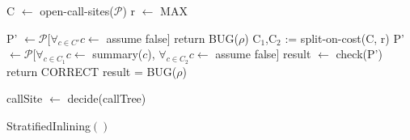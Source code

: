 \documentclass{article}
\newcommand{\Omit}[1]{}
\begin{document}
\begin{algorithm2e}[t]
\DontPrintSemicolon
{}
\begin{small}
	C $\leftarrow$ open-call-sites($\mathcal{P}$) \;
	r $\leftarrow$ MAX \;
	{
		P' $\leftarrow \mathcal{P}[\forall_{c \in C'} c \leftarrow$ assume false] \;
		{
			return BUG($\rho$) \;
		}
		C$_1$,C$_2$ := split-on-cost(C, r) \;
		P' $\leftarrow \mathcal{P}[\forall_{c \in C_1} c \leftarrow$ summary($c$), 
		$\forall_{c \in C_2} c \leftarrow$ assume false] \;
		result $\leftarrow$ check(P') \;
		{
			return CORRECT \;
		}
		{
			\break \;
		}
                result = BUG($\rho$) \;

	        \Omit{
	        methodsToInline $\leftarrow$ number of procedure in $\rho$ to be inlined \;
		\If {number of COPY threads in $\mathcal{TS} \geq$ 2*methodsToInline} 
		{
                  \For {$c \in \rho$} 
		  {
			  \tcc{check block and must reach query in each copy thread}
			  \For{COPY thread $cid, cid' \in \mathcal{TS}$} {
		            \tcc{block query}
			    P'' $\leftarrow \mathcal{P'}$[Block(c)] \;
                            $\mathcal{TS}$[cid] $\leftarrow$ check(P'');
		            
			    \tcc{must reach query}
			    P'' $\leftarrow \mathcal{P'}$[Must-Reach(c)] \;
                            $\mathcal{TS}$[cid'] $\leftarrow$ check(P'');
			  }
		  }
		}
		}
                callSite $\leftarrow$ decide(callTree) \;     
                  


       }

\end{small}
	\caption{StratifiedInlining$()$
	\label{scheduler}}
\end{algorithm2e}
\end{document}
